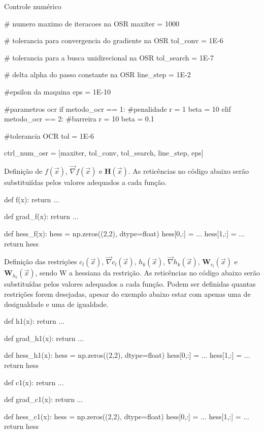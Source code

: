 \documentclass[10pt, a4paper]{article}
\begin{document}
\vspace{5mm}
Controle numérico

\begin{python}
  # numero maximo de iteracoes na OSR
  maxiter = 1000

  # tolerancia para convergencia do gradiente na OSR
  tol_conv = 1E-6

  # tolerancia para a busca unidirecional na OSR
  tol_search = 1E-7

  # delta alpha do passo constante na OSR
  line_step = 1E-2

  #epsilon da maquina
  eps = 1E-10

  #parametros ocr
  if metodo_ocr == 1:
      #penalidade
      r = 1
      beta = 10
  elif metodo_ocr == 2:
      #barreira
      r = 10
      beta = 0.1

  #tolerancia OCR
  tol = 1E-6

  ctrl_num_osr = [maxiter, tol_conv, tol_search, line_step, eps]  
\end{python}

\vspace{5mm}
Definição de $f(\overrightarrow{x})$, $\overrightarrow{\nabla} f(\overrightarrow{x})$ e $\textbf{H}(\overrightarrow{x})$.
As reticências no código abaixo serão substituiídas pelos valores adequados a cada função.

\begin{python}
  def f(x):
    return ...

  def grad_f(x):
    return ...

  def hess_f(x):
    hess = np.zeros((2,2), dtype=float)
    hess[0,:] = ...
    hess[1,:] = ...
    return hess
\end{python}

\vspace{5mm}
Definição das restrições $c_l(\overrightarrow{x})$, $\overrightarrow{\nabla}c_l(\overrightarrow{x})$,
$h_k(\overrightarrow{x})$, $\overrightarrow{\nabla}h_k(\overrightarrow{x})$, $\textbf{W}_{c_l}(\overrightarrow{x})$ e
$\textbf{W}_{h_k}(\overrightarrow{x})$, sendo W a hessiana da restrição.
As reticências no código abaixo serão substituídas pelos valores adequados a cada função. Podem ser definidas quantas restrições
forem desejadas, apesar do exemplo abaixo estar com apenas uma de desigualdade e uma de igualdade.

\begin{python}

  def h1(x):
    return ...

  def grad_h1(x):
    return ...

  def hess_h1(x):
    hess = np.zeros((2,2), dtype=float)
    hess[0,:] = ...
    hess[1,:] = ...
    return hess

  def c1(x):
    return ...

  def grad_c1(x):
    return ...

  def hess_c1(x):
    hess = np.zeros((2,2), dtype=float)
    hess[0,:] = ...
    hess[1,:] = ...
    return hess
\end{python}
\end{document}
